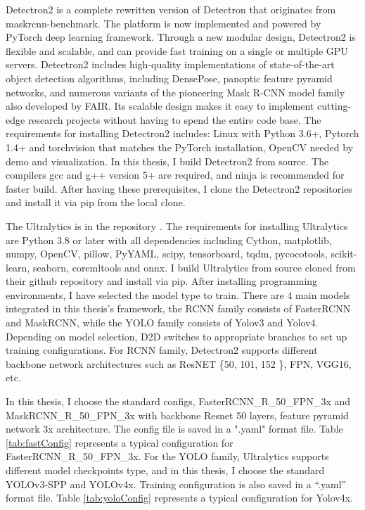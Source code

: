 Detectron2 is a complete rewritten version of Detectron that originates from maskrcnn-benchmark. The platform is now implemented and powered by PyTorch deep learning framework. Through a new modular design, Detectron2 is flexible and scalable, and can provide fast training on a single or multiple GPU servers. Detectron2 includes high-quality implementations of state-of-the-art object detection algorithms, including DensePose, panoptic feature pyramid networks, and numerous variants of the pioneering Mask R-CNN model family also developed by FAIR. Its scalable design makes it easy to implement cutting-edge research projects without having to spend the entire code base. The requirements for installing Detectron2 includes: Linux with Python 3.6+, Pytorch 1.4+ and torchvision that matches the PyTorch installation, OpenCV needed by demo and visualization. In this thesis, I build Detectron2 from source. The compilers gcc and g++ version 5+ are required, and ninja is recommended for faster build. After having these prerequisites, I clone the Detectron2 repositories and install it via pip from the local clone.

The Ultralytics  is in the repository \cite{glenn_jocher_2020_4154370}. The requirements for installing Ultralytics are Python 3.8 or later with all dependencies including Cython, matplotlib, numpy, OpenCV, pillow, PyYAML, scipy, tensorboard, tqdm, pycocotools, scikit-learn, seaborn, coremltools and onnx. I build Ultralytics from source cloned from their github repository and install via pip.
After installing programming environments, I have selected the model type to train. There are 4 main models integrated in this thesis's framework, the RCNN family consists of FasterRCNN and MaskRCNN, while the YOLO family consists of Yolov3 and Yolov4. Depending on model selection, D2D switches to appropriate branches to set up training configurations. For RCNN family, Detectron2 supports different backbone network architectures such as ResNET \{50, 101, 152 \}, FPN, VGG16, etc.

In this thesis, I choose the standard configs, FasterRCNN\_R\_50\_FPN\_3x and MaskRCNN\_R\_50\_FPN\_3x with backbone Resnet 50 layers, feature pyramid network 3x architecture. The config file is saved in a ".yaml" format file. Table \ref{tab:fastConfig} represents a typical configuration for FasterRCNN\_R\_50\_FPN\_3x.
For the YOLO family, Ultralytics supports different model checkpoints type, and in this thesis, I choose the standard YOLOv3-SPP and YOLOv4x. Training configuration is also saved in a “.yaml” format file. Table \ref{tab:yoloConfig} represents a typical configuration for Yolov4x.


